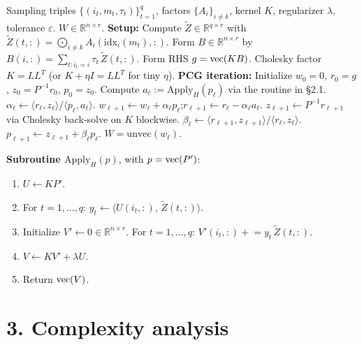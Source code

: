\begin{algorithm}[H]
\caption{PCG for the RKHS mode-$k$ subproblem}
\begin{algorithmic}[1]
\Require Sampling triples $\{(i_t,m_t,\tau_t)\}_{t=1}^q$, factors $\{A_i\}_{i\ne k}$, kernel $K$, regularizer $\lambda$, tolerance $\varepsilon$.
\Ensure $W\in\mathbb R^{n\times r}$.
\State \textbf{Setup:}
\State \quad Compute $\widetilde Z\in\mathbb R^{q\times r}$ with $\widetilde Z(t,:)=\bigodot_{i\ne k} A_i(\mathrm{idx}_i(m_t),:)$. 
\State \quad Form $B\in\mathbb R^{n\times r}$ by $B(i,:)=\sum_{t:i_t=i}\tau_t\,\widetilde Z(t,:)$. 
\State \quad Form RHS $g=\operatorname{vec}(KB)$. 
\State \quad Cholesky factor $K=L L^T$ (or $K+\eta I=LL^T$ for tiny $\eta$). 
\State \textbf{PCG iteration:}  Initialize $w_0=0$, $r_0=g$, $z_0=P^{-1}r_0$, $p_0=z_0$.
  \State Compute $a_\ell:=\mathrm{Apply}_H(p_\ell)$ via the routine in \S2.1. 
  \State $\alpha_\ell\gets\langle r_\ell,z_\ell\rangle/\langle p_\ell,a_\ell\rangle$.
  \State $w_{\ell+1}\gets w_\ell+\alpha_\ell p_\ell$;\quad $r_{\ell+1}\gets r_\ell-\alpha_\ell a_\ell$.
  \State $z_{\ell+1}\gets P^{-1}r_{\ell+1}$ via Cholesky back-solve on $K$ blockwise. 
  \State $\beta_\ell\gets\langle r_{\ell+1},z_{\ell+1}\rangle/\langle r_\ell,z_\ell\rangle$.
  \State $p_{\ell+1}\gets z_{\ell+1}+\beta_\ell p_\ell$.
\EndFor
\State \Return $W=\mathrm{unvec}(w_\ell)$.
\end{algorithmic}
\end{algorithm}

\noindent\textbf{Subroutine $\mathrm{Apply}_H(p)$}, with $p=\operatorname{vec}(P')$:
\begin{enumerate}\setlength\itemsep{2pt}
\item $U\gets K P'$. 
\item For $t=1,\ldots,q$: $y_t\gets \langle U(i_t,:),\,\widetilde Z(t,:)\rangle$. 
\item Initialize $V'\gets 0\in\mathbb R^{n\times r}$.  For $t=1,\ldots,q$: $V'(i_t,:)\mathrel{+}=y_t\,\widetilde Z(t,:)$. 
\item $V\gets KV' + \lambda U$. 
\item Return $\operatorname{vec}(V)$.
\end{enumerate}

\section*{3. Complexity analysis}

